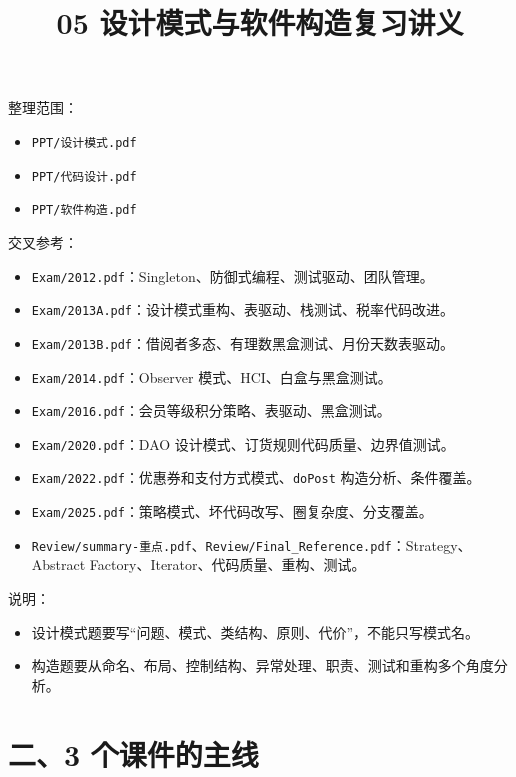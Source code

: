 \documentclass[UTF8,zihao=-4]{ctexart}
\title{05 设计模式与软件构造复习讲义}
\author{}
\date{}
\begin{document}
\maketitle
\tableofcontents
\newpage


整理范围：

\begin{itemize}
\item \texttt{PPT/设计模式.pdf}
\item \texttt{PPT/代码设计.pdf}
\item \texttt{PPT/软件构造.pdf}
\end{itemize}

交叉参考：

\begin{itemize}
\item \texttt{Exam/2012.pdf}：Singleton、防御式编程、测试驱动、团队管理。
\item \texttt{Exam/2013A.pdf}：设计模式重构、表驱动、栈测试、税率代码改进。
\item \texttt{Exam/2013B.pdf}：借阅者多态、有理数黑盒测试、月份天数表驱动。
\item \texttt{Exam/2014.pdf}：Observer 模式、HCI、白盒与黑盒测试。
\item \texttt{Exam/2016.pdf}：会员等级积分策略、表驱动、黑盒测试。
\item \texttt{Exam/2020.pdf}：DAO 设计模式、订货规则代码质量、边界值测试。
\item \texttt{Exam/2022.pdf}：优惠券和支付方式模式、\texttt{doPost} 构造分析、条件覆盖。
\item \texttt{Exam/2025.pdf}：策略模式、坏代码改写、圈复杂度、分支覆盖。
\item \texttt{Review/summary-重点.pdf}、\texttt{Review/Final\_Reference.pdf}：Strategy、Abstract Factory、Iterator、代码质量、重构、测试。
\end{itemize}

说明：

\begin{itemize}
\item 设计模式题要写“问题、模式、类结构、原则、代价”，不能只写模式名。
\item 构造题要从命名、布局、控制结构、异常处理、职责、测试和重构多个角度分析。
\end{itemize}

\section{二、3 个课件的主线}
\end{document}
